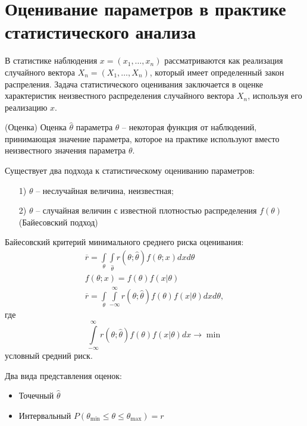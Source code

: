 \section{Оценивание параметров в практике статистического анализа}
\par
В статистике наблюдения $x = \left(x_1, \ldots, x_n\right)$ рассматриваются как реализация случайного вектора $X_n = \left(X_1, \ldots, X_n\right)$, который имеет определенный закон распреления. Задача статистического оценивания заключается в оценке характеристик неизвестного распределения случайного вектора $X_n$, используя его реализацию $x$.

\begin{definition}{(Оценка)}{}
    Оценка $\hat{\theta}$ параметра $\theta$ -- некоторая функция от наблюдений, принимающая значение параметра, которое на практике используют вместо неизвестного значения параметра $\theta$.
\end{definition}

\par
Существует два подхода к статистическому оцениванию параметров:
\begin{enumerate}
    \item[1) ] $\theta$ -- неслучайная величина, неизвестная;
    \item[2) ] $\theta$ -- случайная величин с известной плотностью распределения $f(\theta)$ (Байесовский подход) 
\end{enumerate}

\begin{theorema}{}{}
    Байесовский критерий минимального среднего риска оценивания:
    \[
        \begin{array}{c}
           \displaystyle \overline{r} = \int\limits_{\theta}\int\limits_{\hat{\theta}} r\left(\theta; \hat{\theta}\right)f(\theta; x) dxd\theta\\[0.2cm]
           \displaystyle f(\theta; x) = f(\theta)f(x| \theta)\\[0.5cm]
           \displaystyle\overline{r} = \int\limits_{\theta}\int \limits_{-\infty}^\infty r\left(\theta; \hat{\theta}\right)f(\theta)f(x|\theta) dxd\theta,
        \end{array}  
    \]
    где
    \[
        \int\limits_{-\infty}^\infty r \left(\theta; \hat{\theta}\right) f(\theta) f(x|\theta) dx \to \min
    \]
    условный средний риск.
\end{theorema}

\par
Два вида представления оценок:
\begin{itemize}
    \item Точечный $\hat{\theta}$
    \item Интервальный $P\left(\theta_{\min} \leq \theta \leq \theta_{\max}\right) = r$
\end{itemize}

